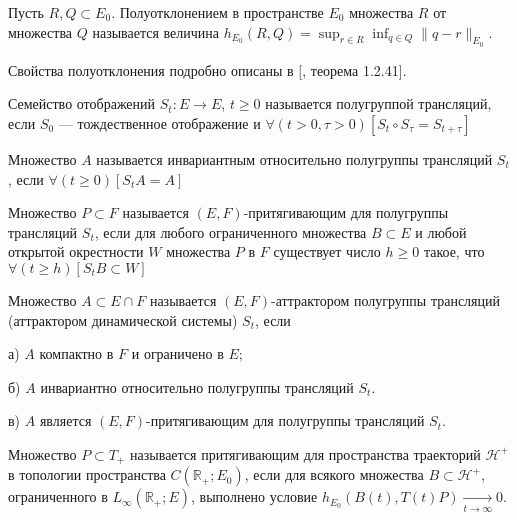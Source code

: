 \begin{definition}
Пусть $R,Q \subset E_0$.
Полуотклонением в пространстве $E_0$ множества $R$ от множества $Q$ называется величина
$
	h_{E_0}(R,Q) = \sup_{r\in R} \inf_{q \in Q} \| q - r \|_{E_0}.
$
\end{definition}
Свойства полуотклонения подробно описаны в [\cite{mnogozn}, теорема 1.2.41].



\begin{definition}
Семейство отображений $S_t : E \to E$, $t \geq 0$ называется полугруппой трансляций,
если $S_0$ --- тождественное отображение и
$
	\forall(t>0,\tau>0)[S_t \circ S_\tau = S_{t+\tau}]
$
\end{definition}

\begin{definition}
Множество $A$ называется инвариантным относительно полугруппы трансляций $S_t$, если
$
	\forall(t\geq 0)[S_t A = A]
$
\end{definition}

\begin{definition}
Множество $P \subset F$ называется $(E,F)$-притягивающим для полугруппы трансляций $S_t$,
если для любого ограниченного множества $B \subset E$ и любой открытой окрестности $W$ множества $P$ в $F$ существует число $h\geq 0$ такое, что
$
	\forall(t \geq h)[S_t B \subset W]
$
\end{definition}


\begin{definition}
Множество $A\subset E\cap F$ называется $(E,F)$-аттрактором полугруппы трансляций (аттрактором динамической системы)  $S_t$, если

а) $A$ компактно в $F$ и ограничено в $E$;

б) $A$ инвариантно относительно полугруппы трансляций $S_t$.

в) $A$ является $(E,F)$-притягивающим для полугруппы трансляций $S_t$.

\end{definition}


\begin{definition}
	Множество $P \subset T_+$ называется притягивающим для пространства траекторий $\mathcal{H}^+$ в топологии пространства $C(\mathbb{R}_+; E_0)$,
	если для всякого множества $B \subset \mathcal{H}^+$, ограниченного в $L_{\infty}(\mathbb{R}_+;E)$, выполнено условие
	$
		h_{E_0}(B(t),T(t)P) \xrightarrow[t\to\infty]{}0
	$.
\end{definition}

